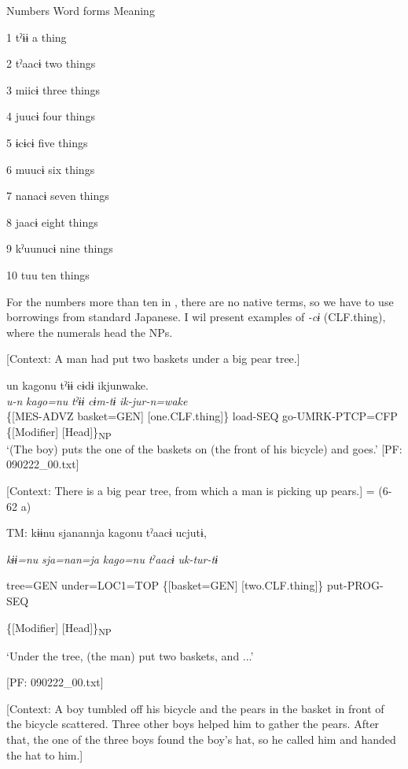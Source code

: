 Numbers  Word forms  Meaning

1  tˀɨɨ  a thing

2  tˀaacɨ  two things

3  miicɨ  three things

4  juucɨ  four things

5  ɨcɨcɨ  five things

6  muucɨ  six things

7  nanacɨ  seven things

8  jaacɨ  eight things

9  kˀuunucɨ  nine things

10  tuu  ten things

For the numbers more than ten in , there are no native terms, so we have to use borrowings from standard Japanese. I wil present examples of \textit{{}-cɨ} (CLF.thing), where the numerals head the NPs.

\ea \label{ex:7:12}
\ea \label{ex:7:12a} [Context: A man had put two baskets under a big pear tree.]

\gllll  un  kagonu  tˀɨɨ  cɨdɨ   ikjunwake.\\
\textit{u-n}  \textit{kago=nu}  \textit{tˀɨɨ}  \textit{cɨm-tɨ} \textit{ik-jur-n=wake}\\
\{[MES-ADVZ  basket=GEN]  [one.CLF.thing]\}  load-SEQ          go-UMRK-PTCP=CFP\\
\{[Modifier]    [Head]\}\textsubscript{NP}  \\
\glt ‘(The boy) puts the one of the baskets on (the front of his bicycle) and goes.’ [PF: 090222\_00.txt]

\ex \label{ex:7:12b}[Context: There is a big pear tree, from which a man is picking up pears.] = (6-62 a)

    TM:  kɨɨnu  sjanannja  kagonu  tˀaacɨ  ucjutɨ,

      \textit{kɨɨ=nu}  \textit{sja=nan=ja}  \textit{kago=nu}  \textit{tˀaacɨ}  \textit{uk-tur-tɨ}
                                                                              
      tree=GEN  under=LOC1=TOP  \{[basket=GEN]  [two.CLF.thing]\}   put-PROG-SEQ
                                                                              
          \{[Modifier]  [Head]\}\textsubscript{NP}

      ‘Under the tree, (the man) put two baskets, and ...’

      [PF: 090222\_00.txt]

\ex \label{ex:7:12c}[Context: A boy tumbled off his bicycle and the pears in the basket in front of the bicycle scattered. Three other boys helped him to gather the pears. After that, the one of the three boys found the boy’s hat, so he called him and handed the hat to him.]


